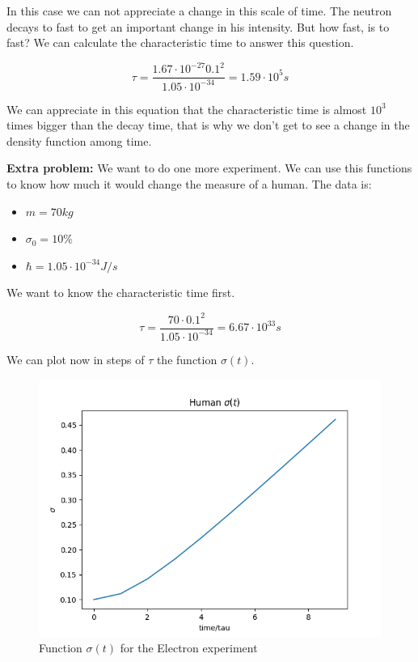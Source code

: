 In this case we can not appreciate a change in this scale of time. The neutron decays to fast to get an important change in his intensity. But how fast, is to fast? We can calculate the characteristic time to answer this question.

\begin{equation}
    \tau = \frac{1.67 \cdot 10^{-27} 0.1^2}{1.05 \cdot 10^{-34}} = 1.59 \cdot 10^5 s
\end{equation}

We can appreciate in this equation that the characteristic time is almost $10^3$ times bigger than the decay time, that is why we don't get to see a change in the density function among time.

\textbf{Extra problem: } We want to do one more experiment. We can use this functions to know how much it would change the measure of a human. The data is:

\begin{itemize}
    \item $m = 70 kg$
    \item $ \sigma_0 = 10\% $
    \item $\hbar = 1.05 \cdot 10^{-34} J/s$
\end{itemize}

We want to know the characteristic time first.

\begin{equation}
    \label{2.39}
    \tau = \frac{70\cdot 0.1^2}{1.05 \cdot 10^{-34}} = 6.67 \cdot 10^{33} s
\end{equation}

We can plot now in steps of $\tau$ the function $\sigma(t)$.

\begin{figure}[H]
    \centering
    \includegraphics{images2/Human/sigma.png}
    \caption{Function $\sigma(t)$ for the Electron experiment}
    \label{fig:sigma_human}
\end{figure}

